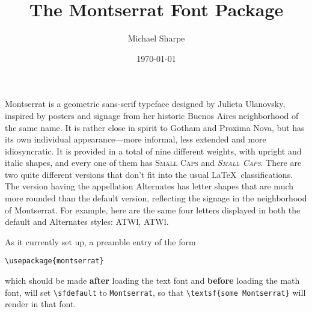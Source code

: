 \documentclass[11pt]{article}
\title{The Montserrat Font Package}
\author{Michael Sharpe}
\date{\today}  %
\begin{document}
\maketitle


Montserrat is a geometric sans-serif typeface designed by  Julieta Ulanovsky, inspired by posters and signage from her historic Buenos Aires neighborhood of the same name. It is rather close in spirit to Gotham and Proxima Nova, but has its own individual appearance---more informal, less extended and more idiosyncratic. It is provided in a total of nine different weights, with upright and italic shapes, and every one of them has \textsc{Small Caps} and \textit{\textsc{Small Caps}}. There are two quite different versions that don't fit into the usual \LaTeX\ classifications. The version having the appellation Alternates has letter shapes that are much more rounded than the default version, reflecting the signage in the neighborhood of Montserrat. For example, here are the same four letters displayed in both the default and  Alternates styles: ATWl, {\montserratalt ATWl}.

As it currently set up, a preamble entry of the form
\begin{verbatim}
\usepackage{montserrat}
\end{verbatim}
which should be made \textbf{after} loading the text font and \textbf{before} loading the math font, will set \verb|\sfdefault| to \verb|Montserrat|, so that \verb|\textsf{some Montserrat}| will render in that font. 
\end{document}
